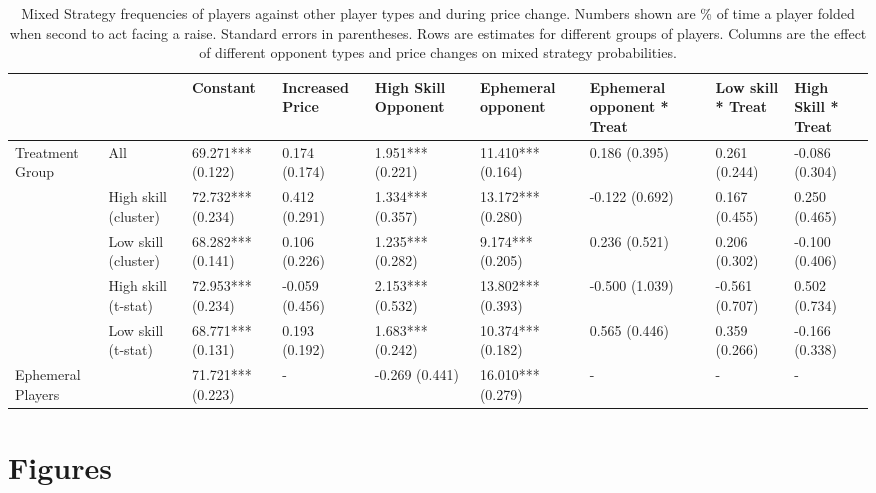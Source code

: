 \documentclass[12pt]{article}
\begin{document}
\begin{landscape}
\begin{table}[hp]
	\begin{tabular}{ p{1.75cm} | p{2cm} | p{2cm} | p{2cm} | p{2cm} | p{2cm} | p{2cm} | p{2cm} | p{2cm} |}
		& 
		&
		Constant &
		Increased Price &
		High Skill Opponent &
		Ephemeral opponent &
		Ephemeral opponent * Treat &
		Low skill * Treat &
		High Skill * Treat \\
		\hline
		\multirow{5}{2cm}{Treatment Group} & 
		All & 
		69.271*** (0.122)& 
		0.174 (0.174) &
		1.951*** (0.221) &
		11.410*** (0.164) &
		0.186 (0.395) &
		0.261 (0.244) &
		-0.086 (0.304)
		\\
		&
		High skill (cluster) &
		72.732*** (0.234) &
		0.412 (0.291) &
		1.334*** (0.357) &
		13.172*** (0.280) &
		-0.122 (0.692) &
		0.167 (0.455) &
		0.250 (0.465)
		\\
		&
		Low skill (cluster) &
		68.282*** (0.141) &
		0.106 (0.226) &
		1.235*** (0.282) &
		9.174*** (0.205) &
		0.236 (0.521) &
		0.206 (0.302) &
		-0.100 (0.406)
		\\
		&
		High skill (t-stat) & 
		72.953*** (0.234) &
		-0.059 (0.456) &
		2.153*** (0.532) &
		13.802*** (0.393) &
		-0.500 (1.039) &
		-0.561 (0.707) &
		0.502 (0.734)
		\\
		&
		Low skill (t-stat) &
		68.771*** (0.131) &
		0.193 (0.192) &
		1.683*** (0.242) &
		10.374*** (0.182) &
		0.565 (0.446) &
		0.359 (0.266) &
		-0.166 (0.338)
		\\
		\hline
		Ephemeral Players&
		&
		71.721*** (0.223) &
		- &
		-0.269 (0.441) &
		16.010*** (0.279) &
		-  &
		-  &
		-
	\end{tabular}
	\caption{Mixed Strategy frequencies of players against other player types and during price change. Numbers shown are \% of time a player folded when second to act facing a raise. Standard errors in parentheses. Rows are estimates for different groups of players. Columns are the effect of different opponent types and price changes on mixed strategy probabilities.}
	\label{table:2}
\end{table}
\end{landscape}
\clearpage

\section*{Figures} \label{sec:fig}

\end{document}
